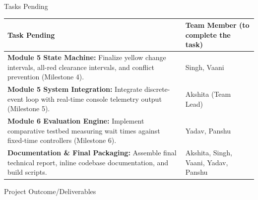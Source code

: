 \documentclass[12pt,a4paper]{article}
\newcommand{\sectiontitle}[1]{%
    {\color{GEUBlue}
    \fontsize{16.5}{20}\selectfont #1}
}
\newcommand{\instruction}[1]{%
    {\color{InstructionGrey}
    \fontsize{9.5}{12}\selectfont #1}
}
\begin{document}
\vspace{0.40cm}

\sectiontitle{Tasks Pending}

\vspace{0.03cm}

\instruction{

}

\vspace{0.15cm}

\begin{tabularx}{\textwidth}{
|>{\raggedright\arraybackslash}p{}
|>{\raggedright\arraybackslash}X|
}
\hline
\textbf{Task Pending} & \textbf{Team Member (to complete the task)} \\
\hline
\textbf{Module 5 State Machine:} Finalize yellow change intervals, all-red clearance intervals, and conflict prevention (Milestone 4). & Singh, Vaani \\
\hline
\textbf{Module 5 System Integration:} Integrate discrete-event loop with real-time console telemetry output (Milestone 5). & Akshita (Team Lead) \\
\hline
\textbf{Module 6 Evaluation Engine:} Implement comparative testbed measuring wait times against fixed-time controllers (Milestone 6). & Yadav, Panshu \\
\hline
\textbf{Documentation \& Final Packaging:} Assemble final technical report, inline codebase documentation, and build scripts. & Akshita, Singh, Vaani, Yadav, Panshu \\
\hline
\end{tabularx}

\newpage


\vspace*{0.05cm}

\sectiontitle{Project Outcome/Deliverables}

\vspace{0.03cm}

\instruction{

}

\vspace{0.18cm}
\end{document}
